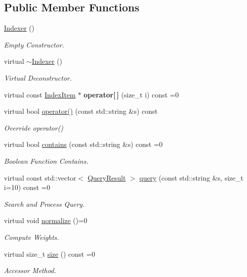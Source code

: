 \subsection*{Public Member Functions}
\begin{DoxyCompactItemize}
\item 
\mbox{\label{class_indexer_ac4c8c21c68d62185ceddbad8781e3b67}} 
\hyperlink{class_indexer_ac4c8c21c68d62185ceddbad8781e3b67}{Indexer} ()
\begin{DoxyCompactList}\small\item\em Empty Constructor. \end{DoxyCompactList}\item 
\mbox{\label{class_indexer_a0fd33d8c08067e6042d189fdf343af01}} 
virtual \hyperlink{class_indexer_a0fd33d8c08067e6042d189fdf343af01}{$\sim$\+Indexer} ()
\begin{DoxyCompactList}\small\item\em Virtual Deconstructor. \end{DoxyCompactList}\item 
\mbox{\label{class_indexer_ae99a41e5b92853e98befbf82706cfc55}} 
virtual const \hyperlink{class_index_item}{Index\+Item} $\ast$ {\bfseries operator\mbox{[}$\,$\mbox{]}} (size\+\_\+t i) const =0
\item 
virtual bool \hyperlink{class_indexer_aa2be6d79e0425aafd10b98118fcbb4ee}{operator()} (const std\+::string \&s) const
\begin{DoxyCompactList}\small\item\em Override operator() \end{DoxyCompactList}\item 
virtual bool \hyperlink{class_indexer_abb847ff86be1ec9265fb53a5ac6f7008}{contains} (const std\+::string \&s) const =0
\begin{DoxyCompactList}\small\item\em Boolean Function Contains. \end{DoxyCompactList}\item 
virtual const std\+::vector$<$ \hyperlink{class_query_result}{Query\+Result} $>$ \hyperlink{class_indexer_a8d98ba740db6f5f8521d557bf908aead}{query} (const std\+::string \&s, size\+\_\+t i=10) const =0
\begin{DoxyCompactList}\small\item\em Search and Process Query. \end{DoxyCompactList}\item 
virtual void \hyperlink{class_indexer_a84f50c7bac96cd5a8daa18899a39bb5d}{normalize} ()=0
\begin{DoxyCompactList}\small\item\em Compute Weights. \end{DoxyCompactList}\item 
virtual size\+\_\+t \hyperlink{class_indexer_ab8b3e17bbf16d54e1e773a1630abb138}{size} () const =0
\begin{DoxyCompactList}\small\item\em Accessor Method. \end{DoxyCompactList}\end{DoxyCompactItemize}
